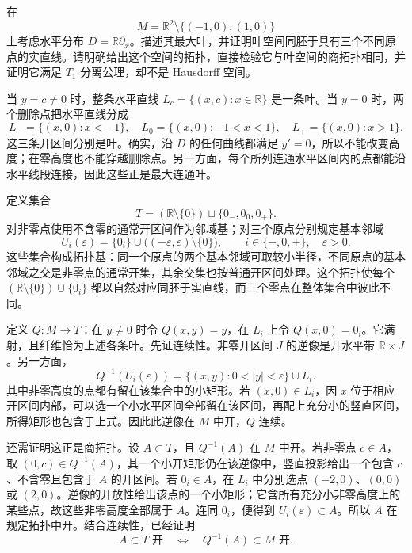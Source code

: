 \begin{exercise}
	\label{g1:exr:1305-triple-origin}
	在
	\[
		M=\mathbb R^2\setminus\{(-1,0),(1,0)\}
	\]
	上考虑水平分布 \(D=\mathbb R\partial_x\)。描述其最大叶，并证明叶空间同胚于具有三个不同原点的实直线。请明确给出这个空间的拓扑，直接检验它与叶空间的商拓扑相同，并证明它满足 \(T_1\) 分离公理，却不是 Hausdorff 空间。
\end{exercise}
\begin{solution}
	当 \(y=c\ne0\) 时，整条水平直线 \(L_c=\{(x,c):x\in\mathbb R\}\) 是一条叶。当 \(y=0\) 时，两个删除点把水平直线分成
	\[
		L_-=\{(x,0):x<-1\},\quad
		L_0=\{(x,0):-1<x<1\},\quad
		L_+=\{(x,0):x>1\}.
	\]
	这三条开区间分别是叶。确实，沿 \(D\) 的任何曲线都满足 \(y'=0\)，所以不能改变高度；在零高度也不能穿越删除点。另一方面，每个所列连通水平区间内的点都能沿水平线段连接，因此这些正是最大连通叶。

	定义集合
	\[
		T=(\mathbb R\setminus\{0\})\sqcup\{0_-,0_0,0_+\}.
	\]
	对非零点使用不含零的通常开区间作为邻域基；对三个原点分别规定基本邻域
	\[
		U_i(\varepsilon)=\{0_i\}\cup
		\bigl((-\varepsilon,\varepsilon)\setminus\{0\}\bigr),
		\qquad i\in\{-,0,+\},\quad\varepsilon>0.
	\]
	这些集合构成拓扑基：同一个原点的两个基本邻域可取较小半径，不同原点的基本邻域之交是非零点的通常开集，其余交集也按普通开区间处理。这个拓扑使每个 \((\mathbb R\setminus\{0\})\cup\{0_i\}\) 都以自然对应同胚于实直线，而三个零点在整体集合中彼此不同。

	定义 \(Q:M\to T\)：在 \(y\ne0\) 时令 \(Q(x,y)=y\)，在 \(L_i\) 上令 \(Q(x,0)=0_i\)。它满射，且纤维恰为上述各条叶。先证连续性。非零开区间 \(J\) 的逆像是开水平带 \(\mathbb R\times J\)。另一方面，
	\[
		Q^{-1}(U_i(\varepsilon))
		=\{(x,y):0<|y|<\varepsilon\}\cup L_i.
	\]
	其中非零高度的点都有留在该集合中的小矩形。若 \((x,0)\in L_i\)，因 \(x\) 位于相应开区间内部，可以选一个小水平区间全部留在该区间，再配上充分小的竖直区间，所得矩形也包含于上式。因此此逆像在 \(M\) 中开，\(Q\) 连续。

	还需证明这正是商拓扑。设 \(A\subset T\)，且 \(Q^{-1}(A)\) 在 \(M\) 中开。若非零点 \(c\in A\)，取 \((0,c)\in Q^{-1}(A)\)，其一个小开矩形仍在该逆像中，竖直投影给出一个包含 \(c\)、不含零且包含于 \(A\) 的开区间。若 \(0_i\in A\)，在 \(L_i\) 中分别选点 \((-2,0)\)、\((0,0)\) 或 \((2,0)\)。逆像的开放性给出该点的一个小矩形；它含所有充分小非零高度上的某些点，故这些非零高度全部属于 \(A\)。连同 \(0_i\)，便得到 \(U_i(\varepsilon)\subset A\)。所以 \(A\) 在规定拓扑中开。结合连续性，已经证明
	\[
		A\subset T\text{ 开}\quad\Longleftrightarrow\quad Q^{-1}(A)\subset M\text{ 开}.
	\]


\end{solution}

